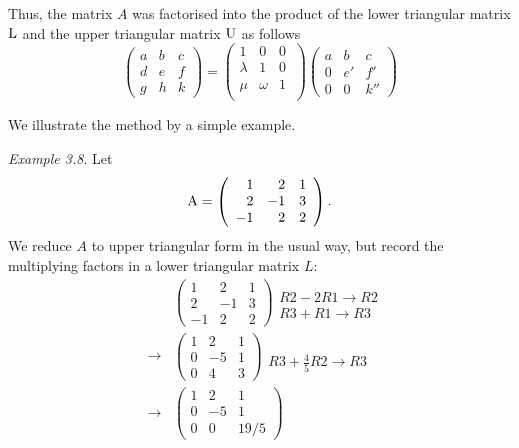 \documentclass[
  letterpaper,
  DIV=11,
  numbers=noendperiod]{scrartcl}
\theoremstyle{remark}
\begin{document}
Thus, the matrix \(A\) was factorised into the product of the lower
triangular matrix \({\rm L}\) and the upper triangular matrix
\({\rm U}\) as follows \[\left(\begin{array}{rrr}
a & b & c\\
d & e & f\\
g & h & k
\end{array}\right) =
\left(\begin{array}{rrr}
 1 & 0  & 0 \ \\
 \lambda & 1 & 0  \\
 \mu &  \omega & 1  \\
\end{array} \right)
 \left(\begin{array}{rrr}
 a & b & c \\
 0 & e' & f' \\
 0 & 0 & k''
 \end{array}\right)\]

We illustrate the method by a simple example.

\emph{Example 3.8}. Let \[{\rm A} =\left(\begin{array}{rrr}
 1  & 2  & 1  \\
 2  & {-1}  & 3  \\
 {-1}  & 2  & 2  
\end{array} \right).\] We reduce \(A\) to upper triangular form in the
usual way, but record the multiplying factors in a lower triangular
matrix \(L\): \[\begin{aligned}
& &\left(\begin{array}{rrr}
1 & 2 & 1 \\
2 & -1 & 3 \\
-1 & 2 & 2
\end{array}\right)
\begin{array}{r}
\\
R2-2R1\rightarrow R2\\
R3+R1\rightarrow R3
\end{array} \\
&\rightarrow&
\left(\begin{array}{rrr}
1 & 2 & 1 \\
0 & -5 & 1 \\
0 & 4 & 3
\end{array}\right)
\begin{array}{c}
\\
\\
R3+\frac{4}{5}R2\rightarrow R3
\end{array} \\
&\rightarrow&
\left(\begin{array}{rrr}
1 & 2 & 1\\
0 & -5 & 1\\
0 & 0 & 19/5
\end{array}\right)
\end{aligned}\]
\end{document}
